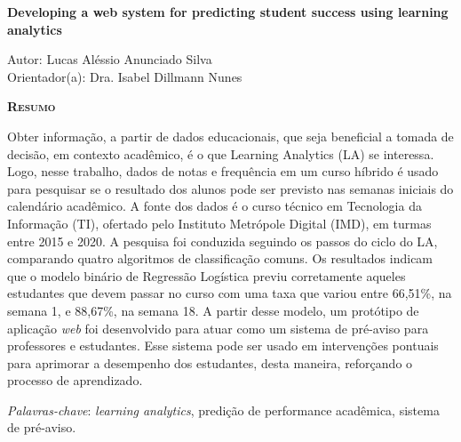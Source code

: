 \begin{center}
	{\Large{\textbf{Developing a web system for predicting student success using learning analytics}}}
\end{center}

\vspace{1cm}

\begin{flushright}
	Autor: Lucas Aléssio Anunciado Silva\\
	Orientador(a): Dra. Isabel Dillmann Nunes
\end{flushright}

\vspace{1cm}

\begin{center}
	\Large{\textsc{\textbf{Resumo}}}
\end{center}

\noindent Obter informação, a partir de dados educacionais, que seja beneficial a tomada de decisão, em contexto acadêmico, é o que Learning Analytics (LA) se interessa. Logo, nesse trabalho, dados de notas e frequência em um curso híbrido é usado para pesquisar se o resultado dos alunos pode ser previsto nas semanas iniciais do calendário acadêmico. A fonte dos dados é o curso técnico em Tecnologia da Informação (TI), ofertado pelo Instituto Metrópole Digital (IMD), em turmas entre 2015 e 2020. A pesquisa foi conduzida seguindo os passos do ciclo do LA, comparando quatro algoritmos de classificação comuns. Os resultados indicam que o modelo binário de Regressão Logística previu corretamente aqueles estudantes que devem passar no curso com uma taxa que variou entre 66,51\%, na semana 1, e 88,67\%, na semana 18. A partir desse modelo, um protótipo de aplicação \emph{web} foi desenvolvido para atuar como um sistema de pré-aviso para professores e estudantes. Esse sistema pode ser usado em intervenções pontuais para aprimorar a desempenho dos estudantes, desta maneira, reforçando o processo de aprendizado.

\noindent\textit{Palavras-chave}: \emph{learning analytics}, predição de performance acadêmica, sistema de pré-aviso.